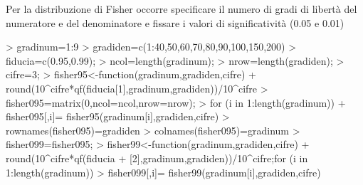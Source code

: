 \documentclass[onecolumn,12pt]{book}
\begin{document}
Per la  distribuzione di Fisher occorre specificare il numero di gradi di libertà del numeratore e del denominatore e fissare i valori di significatività (0.05 e 0.01)

\begin{Schunk}
\begin{Sinput}
> gradinum=1:9
> gradiden=c(1:40,50,60,70,80,90,100,150,200)
> fiducia=c(0.95,0.99);
> ncol=length(gradinum);
> nrow=length(gradiden);
> cifre=3;
> fisher95<-function(gradinum,gradiden,cifre)
+ round(10^cifre*qf(fiducia[1],gradinum,gradiden))/10^cifre
> fisher095=matrix(0,ncol=ncol,nrow=nrow);
> for (i in 1:length(gradinum))
+ fisher095[,i]= fisher95(gradinum[i],gradiden,cifre)
>  rownames(fisher095)=gradiden
> colnames(fisher095)=gradinum
> fisher099=fisher095;
> fisher99<-function(gradinum,gradiden,cifre)
+ round(10^cifre*qf(fiducia
+ [2],gradinum,gradiden))/10^cifre;for (i in 1:length(gradinum))
> fisher099[,i]= fisher99(gradinum[i],gradiden,cifre)
\end{Sinput}
\end{Schunk}
 \setlength\textheight{9in}
\vfill\eject
\end{document}
